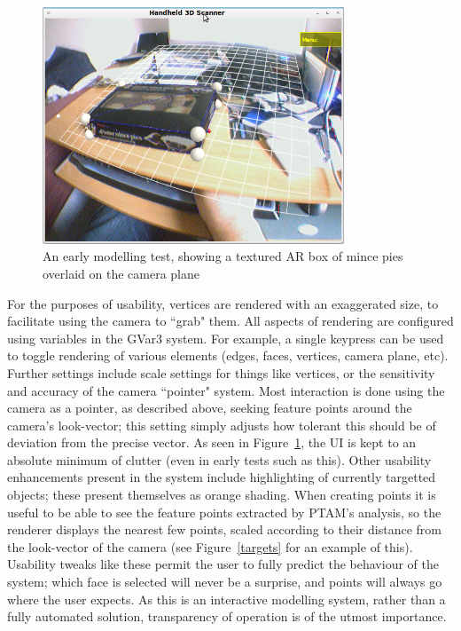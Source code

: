 \documentclass[a4paper,10pt]{article}
\begin{document}
\begin{figure}
  \begin{center}
    \includegraphics[width=340px]{MincePies}
  \end{center}
  \caption{An early modelling test, showing a textured AR box of mince pies overlaid on the camera plane}
  \label{pies}
\end{figure}

For the purposes of usability, vertices are rendered with an exaggerated size, to facilitate using the camera to ``grab" them. All aspects of rendering are configured using variables in the GVar3 system. For example, a single keypress can be used to toggle rendering of various elements (edges, faces, vertices, camera plane, etc). Further settings include scale settings for things like vertices, or the sensitivity and accuracy of the camera ``pointer" system. Most interaction is done using the camera as a pointer, as described above, seeking feature points around the camera's look-vector; this setting simply adjusts how tolerant this should be of deviation from the precise vector. As seen in Figure~\ref{pies}, the UI is kept to an absolute minimum of clutter (even in early tests such as this). Other usability enhancements present in the system include highlighting of currently targetted objects; these present themselves as orange shading. When creating points it is useful to be able to see the feature points extracted by PTAM's analysis, so the renderer displays the nearest few points, scaled according to their distance from the look-vector of the camera (see Figure~\ref{targets} for an example of this). Usability tweaks like these permit the user to fully predict the behaviour of the system; which face is selected will never be a surprise, and points will always go where the user expects. As this is an interactive modelling system, rather than a fully automated solution, transparency of operation is of the utmost importance.
\end{document}

